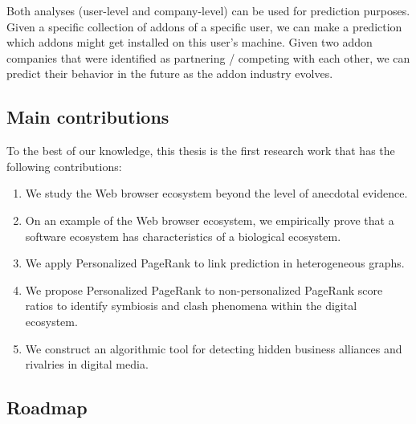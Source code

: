 \documentclass[ijoc,nonblindrev]{informs3} %
\numberwithin{equation}{subsection}
\begin{document}
Both analyses (user-level and company-level) can be used for prediction purposes. Given a specific collection of addons of a specific user, we can make a prediction which addons might get installed on this user's machine. Given two addon companies that were identified as partnering / competing with each other, we can predict their behavior in the future as the addon industry evolves.

\subsection{Main contributions}

To the best of our knowledge, this thesis is the first research work that has the following contributions:\\
\begin{enumerate}
\item We study the Web browser ecosystem beyond the level of anecdotal evidence.
\item On an example of the Web browser ecosystem, we empirically prove that a software ecosystem has characteristics of a biological ecosystem.
\item We apply Personalized PageRank to link prediction in heterogeneous graphs.
\item We propose Personalized PageRank to non-personalized PageRank score ratios to identify symbiosis and clash phenomena within the digital ecosystem.
\item We construct an algorithmic tool for detecting hidden business alliances and rivalries in digital media.
\end{enumerate}



\subsection{Roadmap}
\end{document}
